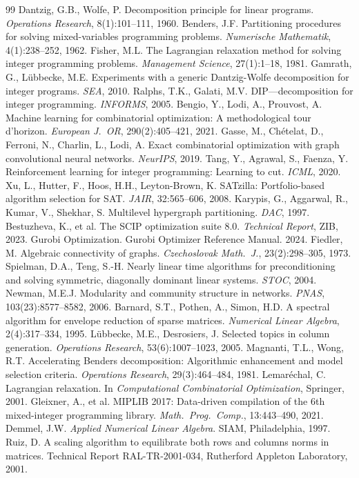 \documentclass[11pt]{article}
\begin{document}

\begin{thebibliography}{99}
 Dantzig, G.B., Wolfe, P. Decomposition principle for linear programs. \emph{Operations Research}, 8(1):101--111, 1960.
 Benders, J.F. Partitioning procedures for solving mixed-variables programming problems. \emph{Numerische Mathematik}, 4(1):238--252, 1962.
 Fisher, M.L. The Lagrangian relaxation method for solving integer programming problems. \emph{Management Science}, 27(1):1--18, 1981.
 Gamrath, G., L\"ubbecke, M.E. Experiments with a generic Dantzig-Wolfe decomposition for integer programs. \emph{SEA}, 2010.
 Ralphs, T.K., Galati, M.V. DIP---decomposition for integer programming. \emph{INFORMS}, 2005.
 Bengio, Y., Lodi, A., Prouvost, A. Machine learning for combinatorial optimization: A methodological tour d'horizon. \emph{European J.\ OR}, 290(2):405--421, 2021.
 Gasse, M., Ch\'{e}telat, D., Ferroni, N., Charlin, L., Lodi, A. Exact combinatorial optimization with graph convolutional neural networks. \emph{NeurIPS}, 2019.
 Tang, Y., Agrawal, S., Faenza, Y. Reinforcement learning for integer programming: Learning to cut. \emph{ICML}, 2020.
 Xu, L., Hutter, F., Hoos, H.H., Leyton-Brown, K. SATzilla: Portfolio-based algorithm selection for SAT. \emph{JAIR}, 32:565--606, 2008.
 Karypis, G., Aggarwal, R., Kumar, V., Shekhar, S. Multilevel hypergraph partitioning. \emph{DAC}, 1997.
 Bestuzheva, K., et al. The SCIP optimization suite 8.0. \emph{Technical Report}, ZIB, 2023.
 Gurobi Optimization. Gurobi Optimizer Reference Manual. 2024.
 Fiedler, M. Algebraic connectivity of graphs. \emph{Czechoslovak Math.\ J.}, 23(2):298--305, 1973.
 Spielman, D.A., Teng, S.-H. Nearly linear time algorithms for preconditioning and solving symmetric, diagonally dominant linear systems. \emph{STOC}, 2004.
 Newman, M.E.J. Modularity and community structure in networks. \emph{PNAS}, 103(23):8577--8582, 2006.
 Barnard, S.T., Pothen, A., Simon, H.D. A spectral algorithm for envelope reduction of sparse matrices. \emph{Numerical Linear Algebra}, 2(4):317--334, 1995.
 L\"ubbecke, M.E., Desrosiers, J. Selected topics in column generation. \emph{Operations Research}, 53(6):1007--1023, 2005.
 Magnanti, T.L., Wong, R.T. Accelerating Benders decomposition: Algorithmic enhancement and model selection criteria. \emph{Operations Research}, 29(3):464--484, 1981.
 Lemar\'{e}chal, C. Lagrangian relaxation. In \emph{Computational Combinatorial Optimization}, Springer, 2001.
 Gleixner, A., et al. MIPLIB 2017: Data-driven compilation of the 6th mixed-integer programming library. \emph{Math.\ Prog.\ Comp.}, 13:443--490, 2021.
 Demmel, J.W. \emph{Applied Numerical Linear Algebra}. SIAM, Philadelphia, 1997.
 Ruiz, D. A scaling algorithm to equilibrate both rows and columns norms in matrices. Technical Report RAL-TR-2001-034, Rutherford Appleton Laboratory, 2001.
\end{thebibliography}
\end{document}

